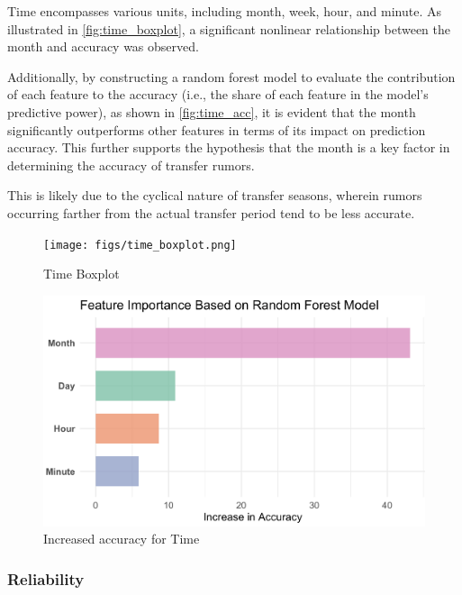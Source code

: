 


Time encompasses various units, including month, week, hour, and minute. As illustrated in \autoref{fig:time_boxplot}, a significant nonlinear relationship between the month and accuracy was observed.

Additionally, by constructing a random forest model to evaluate the contribution of each feature to the accuracy (i.e., the share of each feature in the model's predictive power), as shown in \autoref{fig:time_acc}, it is evident that the month significantly outperforms other features in terms of its impact on prediction accuracy. This further supports the hypothesis that the month is a key factor in determining the accuracy of transfer rumors.

This is likely due to the cyclical nature of transfer seasons, wherein rumors occurring farther from the actual transfer period tend to be less accurate.


\begin{figure}[ht]
    \centering
    \texttt{[image: figs/time\_boxplot.png]}
    \caption{
       Time Boxplot
    }\label{fig:time_boxplot}
\end{figure}

\begin{figure}[ht]
    \centering
    \includegraphics[width=.5\textwidth]{figs/time_acc.png}
    \caption{
       Increased accuracy for Time
    }\label{fig:time_acc}
\end{figure}

\subsubsection{Reliability}

